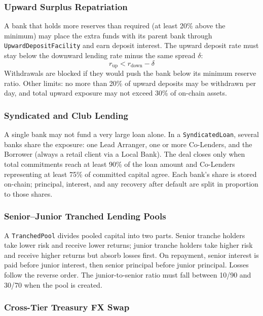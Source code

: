 \documentclass[12pt,a4paper]{report}
\begin{document}
\subsubsection{Upward Surplus Repatriation}
\label{sec:upward-flow}

A bank that holds more reserves than required (at least 20\% above the minimum) may place the extra funds with its parent bank through \texttt{UpwardDepositFacility} and earn deposit interest. The upward deposit rate must stay below the downward lending rate minus the same spread $\delta$:
\begin{equation}
r_{\text{up}} < r_{\text{down}} - \delta
\end{equation}
\noindent Withdrawals are blocked if they would push the bank below its minimum reserve ratio. Other limits: no more than 20\% of upward deposits may be withdrawn per day, and total upward exposure may not exceed 30\% of on-chain assets.

\subsubsection{Syndicated and Club Lending}
\label{sec:syndicated-lending}

A single bank may not fund a very large loan alone. In a \texttt{SyndicatedLoan}, several banks share the exposure: one Lead Arranger, one or more Co-Lenders, and the Borrower (always a retail client via a Local Bank). The deal closes only when total commitments reach at least 90\% of the loan amount and Co-Lenders representing at least 75\% of committed capital agree. Each bank's share is stored on-chain; principal, interest, and any recovery after default are split in proportion to those shares.

\subsubsection{Senior--Junior Tranched Lending Pools}
\label{sec:tranched-pools}

A \texttt{TranchedPool} divides pooled capital into two parts. Senior tranche holders take lower risk and receive lower returns; junior tranche holders take higher risk and receive higher returns but absorb losses first. On repayment, senior interest is paid before junior interest, then senior principal before junior principal. Losses follow the reverse order. The junior-to-senior ratio must fall between 10/90 and 30/70 when the pool is created.

\subsubsection{Cross-Tier Treasury FX Swap}
\label{sec:treasury-fx}
\end{document}
